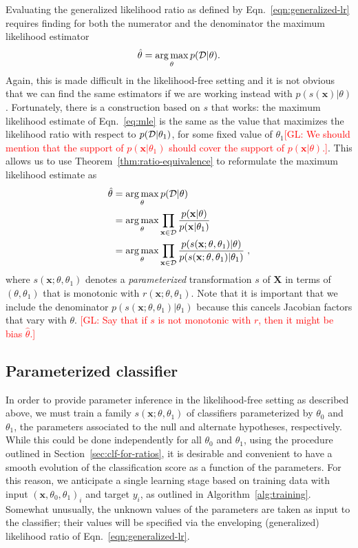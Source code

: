 \documentclass[12pt]{article}
\DeclareMathOperator*{\argmax}{arg\,max}
\numberwithin{equation}{section}
\theoremstyle{plain}
\newcommand{\glnote}[1]{\textcolor{red}{[GL: #1]}}
\begin{document}
Evaluating the generalized likelihood ratio as defined by
Eqn.~\ref{eqn:generalized-lr} requires finding for both the numerator and the
denominator the maximum likelihood estimator
\begin{equation}\label{eq:mle}
    \hat{\theta} = \argmax_\theta p({\cal D} | \theta).
\end{equation}
Again, this is made difficult in the likelihood-free setting and it is not
obvious that we can find the same estimators if we are working instead with
$p(s(\mathbf{x})|\theta)$. Fortunately, there is a construction
based on $s$ that works: the maximum likelihood estimate of Eqn.~\ref{eq:mle} is
the same as the value that maximizes the likelihood ratio with respect to
$p({\cal D}|\theta_1)$, for some fixed value of $\theta_1$\glnote{We should mention that the support of $p(\mathbf{x}|\theta_1)$ should cover the support of $p(\mathbf{x}|\theta)$.}.
This allows us to
use Theorem~\ref{thm:ratio-equivalence} to reformulate the maximum likelihood
estimate as
\begin{align}\label{eq:mle_withs}
\hat{\theta} &= \argmax_\theta  p({\cal D} | \theta) \nonumber \\
&= \argmax_\theta  \prod_{\mathbf{x} \in {\cal D}} \frac{p(\mathbf{x}| \theta)}{p(\mathbf{x}|\theta_1)} \nonumber \\
&= \argmax_\theta  \prod_{\mathbf{x} \in {\cal D}} \frac{p(s(\mathbf{x}; \theta, \theta_1) | \theta)}{p(s(\mathbf{x}; \theta, \theta_1) |\theta_1)} \;,
\end{align}
where $s(\mathbf{x};\theta,\theta_1)$ denotes a \textit{parameterized}
transformation $s$ of $\mathbf{X}$ in terms of $(\theta,\theta_1)$ that is monotonic
with $r(\mathbf{x};\theta,\theta_1)$. Note that it is important that we include
the denominator $p(s(\mathbf{x}; \theta, \theta_1) |\theta_1)$ because this
cancels Jacobian factors that vary with $\theta$. \glnote{Say that if $s$ is not monotonic with $r$, then it might be bias $\hat\theta$.}

\subsection{Parameterized classifier}

In order to provide parameter inference in the likelihood-free setting as
described above, we must train a family $s(\mathbf{x};\theta,\theta_1)$ of classifiers parameterized by
$\theta_0$ and $\theta_1$, the parameters associated to the null and alternate
hypotheses, respectively. While this could be done independently for all
$\theta_0$ and $\theta_1$, using the procedure outlined in
Section~\ref{sec:clf-for-ratios}, it is desirable and convenient to have a
smooth evolution of the classification score as a function of the parameters.
For this reason, we anticipate a single learning stage based on training data with input
$(\mathbf{x}, \theta_0, \theta_1)_i$ and target $y_i$, as outlined in Algorithm~\ref{alg:training}. Somewhat unusually, the
unknown values of the parameters are taken as input to the classifier; their
values will be specified via the enveloping (generalized) likelihood ratio of
Eqn.~\ref{eqn:generalized-lr}.
\end{document}
